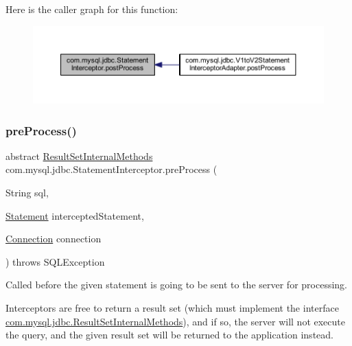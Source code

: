 Here is the caller graph for this function\+:
\nopagebreak
\begin{figure}[H]
\begin{center}
\leavevmode
\includegraphics[width=350pt]{interfacecom_1_1mysql_1_1jdbc_1_1_statement_interceptor_a09f86aac8aebe5751a6f920e42d2d9b4_icgraph}
\end{center}
\end{figure}
\mbox{\label{interfacecom_1_1mysql_1_1jdbc_1_1_statement_interceptor_ae8b6b08014d450768f3f7088f43ce593}} 
\subsubsection{\texorpdfstring{pre\+Process()}{preProcess()}}
{\footnotesize\ttfamily abstract \mbox{\hyperlink{interfacecom_1_1mysql_1_1jdbc_1_1_result_set_internal_methods}{Result\+Set\+Internal\+Methods}} com.\+mysql.\+jdbc.\+Statement\+Interceptor.\+pre\+Process (\begin{DoxyParamCaption}\item[{String}]{sql,  }\item[{\mbox{\hyperlink{interfacecom_1_1mysql_1_1jdbc_1_1_statement}{Statement}}}]{intercepted\+Statement,  }\item[{\mbox{\hyperlink{interfacecom_1_1mysql_1_1jdbc_1_1_connection}{Connection}}}]{connection }\end{DoxyParamCaption}) throws S\+Q\+L\+Exception\hspace{0.3cm}{\ttfamily [abstract]}}

Called before the given statement is going to be sent to the server for processing.

Interceptors are free to return a result set (which must implement the interface \mbox{\hyperlink{interfacecom_1_1mysql_1_1jdbc_1_1_result_set_internal_methods}{com.\+mysql.\+jdbc.\+Result\+Set\+Internal\+Methods}}), and if so, the server will not execute the query, and the given result set will be returned to the application instead.

